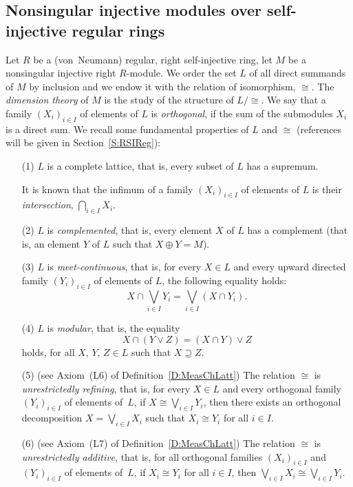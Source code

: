 \documentclass[psamsfonts,reqno]{memo-l}
\theoremstyle{plain}
\theoremstyle{definition}
\theoremstyle{remark}
\numberwithin{equation}{section}
\newcommand{\famm}[2]{(#1)_{#2}}
\begin{document}
\subsection{Nonsingular injective modules over self-injective regular
rings}\label{Su:RSIReg}
Let $R$ be a (von~Neumann) regular, right
self-injective ring,
 let $M$ be a nonsingular injective
right
$R$-module. We order the set $L$ of all direct summands of $M$ by inclusion
and we endow it with the relation of isomorphism, $\cong$. The
\emph{dimension theory} of
$M$ is the study of the structure of $L/{\cong}$. We say that a family
$\famm{X_i}{i\in I}$ of elements of $L$ is \emph{orthogonal}, if the sum of
the submodules $X_i$ is a direct sum. We recall some fundamental properties
of $L$ and $\cong$ (references will be given in Section~\ref{S:RSIReg}):
\begin{itemize}
\item[(1)] $L$ is a complete lattice, that is,
every subset of $L$ has a supremum.

It is known that the infimum of a family $\famm{X_i}{i\in I}$ of
elements of $L$ is their \emph{intersection}, $\bigcap_{i\in I}X_i$.

\item[(2)] $L$ is \emph{complemented},
that is, every element $X$ of $L$
has a complement (that is, an element $Y$ of $L$ such that $X\oplus Y=M$).

\item[(3)] $L$ is \emph{meet-continuous},
that is, for every $X\in L$ and
every upward directed family $\famm{Y_i}{i\in I}$ of elements of $L$,
the following equality holds:
   \[
   X\cap\bigvee_{i\in I}Y_i=\bigvee_{i\in I}(X\cap Y_i).
   \]

\item[(4)] $L$ is \emph{modular}, 
that is, the equality
   \[
   X\cap(Y\vee Z)=(X\cap Y)\vee Z
   \]
holds, for all $X$, $Y$, $Z\in L$ such that $X\supseteq Z$.

\item[(5)] (see Axiom~(L6) of Definition~\ref{D:MeasChLatt}) The relation
$\cong$ is \emph{unrestrictedly refining},
 that is, for every $X\in L$ and
every orthogonal family $\famm{Y_i}{i\in I}$ of elements of~$L$, if
$X\cong\bigvee_{i\in I}Y_i$, then there exists an orthogonal decomposition
$X=\bigvee_{i\in I}X_i$ such that $X_i\cong Y_i$ for all $i\in I$.

\item[(6)] (see Axiom~(L7) of Definition~\ref{D:MeasChLatt})  The relation
$\cong$ is \emph{unrestrictedly additive},
 that is, for all orthogonal
families $\famm{X_i}{i\in I}$ and $\famm{Y_i}{i\in I}$ of elements of~$L$, if
$X_i\cong Y_i$ for all $i\in I$, then
$\bigvee_{i\in I}X_i\cong\bigvee_{i\in I}Y_i$.

\end{itemize}
\end{document}
